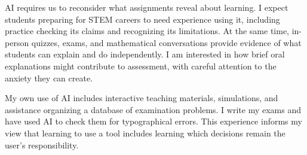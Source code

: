 \documentclass[11pt,letterpaper]{article}
\begin{document}
AI requires us to reconsider what assignments reveal about learning. I expect students preparing for STEM careers to need experience using it, including practice checking its claims and recognizing its limitations. At the same time, in-person quizzes, exams, and mathematical conversations provide evidence of what students can explain and do independently. I am interested in how brief oral explanations might contribute to assessment, with careful attention to the anxiety they can create.

My own use of AI includes interactive teaching materials, simulations, and assistance organizing a database of examination problems. I write my exams and have used AI to check them for typographical errors. This experience informs my view that learning to use a tool includes learning which decisions remain the user's responsibility.
\end{document}
